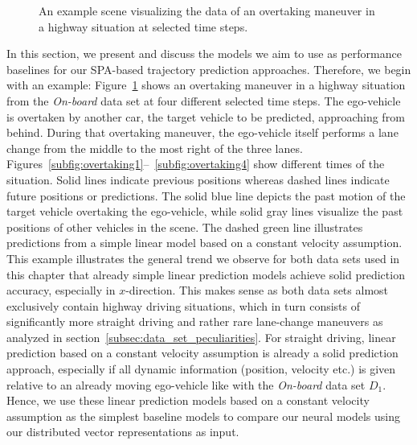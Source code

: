 \begin{figure}[th!]
	\centering
	\vspace{-0.3cm}
	\vspace{-0.3cm}
	\vspace{-0.3cm}
	\caption{An example scene visualizing the data of an overtaking maneuver in a highway situation at selected time steps.}
    \label{fig:overtaking}
\end{figure}

In this section, we present and discuss the models we aim to use as performance baselines for our \ac{SPA}-based trajectory prediction approaches.
Therefore, we begin with an example:
Figure~\ref{fig:overtaking} shows an overtaking maneuver in a highway situation from the \emph{On-board} data set at four different selected time steps.
The ego-vehicle is overtaken by another car, the target vehicle to be predicted, approaching from behind.
During that overtaking maneuver, the ego-vehicle itself performs a lane change from the middle to the most right of the three lanes.
Figures~\ref{subfig:overtaking1}--~\ref{subfig:overtaking4} show different times of the situation.
Solid lines indicate previous positions whereas dashed lines indicate future positions or predictions.
The solid blue line depicts the past motion of the target vehicle overtaking the ego-vehicle, while solid gray lines visualize the past positions of other vehicles in the scene.
The dashed green line illustrates predictions from a simple linear model based on a constant velocity assumption.
This example illustrates the general trend we observe for both data sets used in this chapter that already simple linear prediction models achieve solid prediction accuracy, especially in $x$-direction.
This makes sense as both data sets almost exclusively contain highway driving situations, which in turn consists of significantly more straight driving and rather rare lane-change maneuvers as analyzed in section~\ref{subsec:data_set_peculiarities}.
For straight driving, linear prediction based on a constant velocity assumption is already a solid prediction approach, especially if all dynamic information (position, velocity etc.) is given relative to an already moving ego-vehicle like with the \emph{On-board} data set $D_1$.
Hence, we use these linear prediction models based on a constant velocity assumption as the simplest baseline models to compare our neural models using our distributed vector representations as input.

